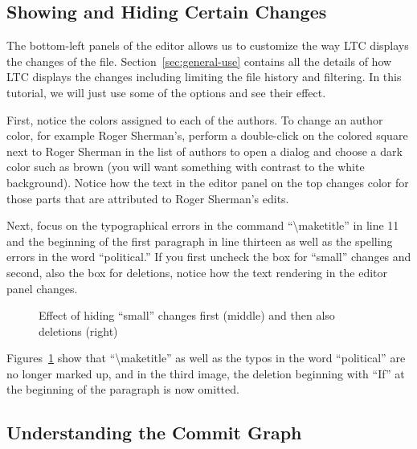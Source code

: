 \subsection{Showing and Hiding Certain Changes}

The bottom-left panels of the editor allows us to customize the way LTC displays the changes of the file.  Section~\ref{sec:general-use} contains all the details of how LTC displays the changes including limiting the file history and filtering.  In this tutorial, we will just use some of the options and see their effect.

First, notice the colors assigned to each of the authors.  To change an author color, for example Roger Sherman's,  perform a double-click on the colored square next to Roger Sherman in the list of authors to open a dialog and  choose a dark color such as brown (you will want something with contrast to the white background).  Notice how the text in the editor panel on the top changes color for those parts that are attributed to Roger Sherman's edits.

Next, focus on the typographical errors in the command ``\textbackslash maketitle'' in line 11 and the beginning of the first paragraph in line thirteen as well as the spelling errors in the word ``political.''  If you first uncheck the box for ``small'' changes and second, also the box for deletions, notice how the text rendering in the editor panel changes.
\begin{figure}[t]
  \centering
  \hspace{2em}
  \hspace{2em}
\caption[Effect of hiding ``small'' changes and deletions]{Effect of hiding ``small'' changes first (middle) and then also deletions (right)} \label{fig:editor-filter-small}
\end{figure}
Figures~\ref{fig:editor-filter-small} show that ``\textbackslash maketitle'' as well as the typos in the word ``political'' are no longer marked up, and in the third image, the deletion beginning with ``If'' at the beginning of the paragraph is now omitted.

\subsection{Understanding the Commit Graph}

